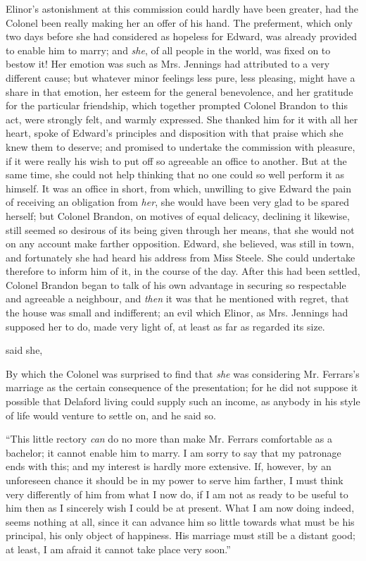Elinor's astonishment at this commission could hardly have been greater, had the Colonel been really making her an offer of his hand. The preferment, which only two days before she had considered as hopeless for Edward, was already provided to enable him to marry; and {\em she}, of all people in the world, was fixed on to bestow it! Her emotion was such as Mrs. Jennings had attributed to a very different cause; but whatever minor feelings less pure, less pleasing, might have a share in that emotion, her esteem for the general benevolence, and her gratitude for the particular friendship, which together prompted Colonel Brandon to this act, were strongly felt, and warmly expressed. She thanked him for it with all her heart, spoke of Edward's principles and disposition with that praise which she knew them to deserve; and promised to undertake the commission with pleasure, if it were really his wish to put off so agreeable an office to another. But at the same time, she could not help thinking that no one could so well perform it as himself. It was an office in short, from which, unwilling to give Edward the pain of receiving an obligation from {\em her}, she would have been very glad to be spared herself; but Colonel Brandon, on motives of equal delicacy, declining it likewise, still seemed so desirous of its being given through her means, that she would not on any account make farther opposition. Edward, she believed, was still in town, and fortunately she had heard his address from Miss Steele. She could undertake therefore to inform him of it, in the course of the day. After this had been settled, Colonel Brandon began to talk of his own advantage in securing so respectable and agreeable a neighbour, and {\em then} it was that he mentioned with regret, that the house was small and indifferent; an evil which Elinor, as Mrs. Jennings had supposed her to do, made very light of, at least as far as regarded its size.

 said she, 

By which the Colonel was surprised to find that {\em she} was considering Mr. Ferrars's marriage as the certain consequence of the presentation; for he did not suppose it possible that Delaford living could supply such an income, as anybody in his style of life would venture to settle on, and he said so.

“This little rectory {\em can} do no more than make Mr. Ferrars comfortable as a bachelor; it cannot enable him to marry. I am sorry to say that my patronage ends with this; and my interest is hardly more extensive. If, however, by an unforeseen chance it should be in my power to serve him farther, I must think very differently of him from what I now do, if I am not as ready to be useful to him then as I sincerely wish I could be at present. What I am now doing indeed, seems nothing at all, since it can advance him so little towards what must be his principal, his only object of happiness. His marriage must still be a distant good; at least, I am afraid it cannot take place very soon.”

